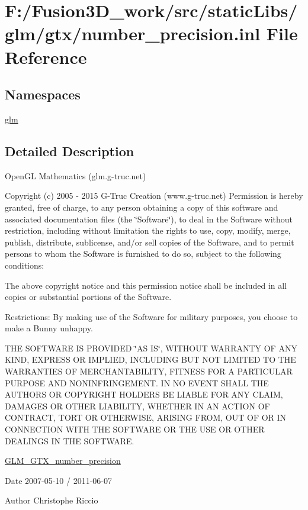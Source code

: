 \hypertarget{number__precision_8inl}{}\section{F\+:/\+Fusion3\+D\+\_\+work/src/static\+Libs/glm/gtx/number\+\_\+precision.inl File Reference}
\label{number__precision_8inl}
\subsection*{Namespaces}
\begin{DoxyCompactItemize}
\item 
 \hyperlink{namespaceglm}{glm}
\end{DoxyCompactItemize}


\subsection{Detailed Description}
Open\+G\+L Mathematics (glm.\+g-\/truc.\+net)

Copyright (c) 2005 -\/ 2015 G-\/\+Truc Creation (www.\+g-\/truc.\+net) Permission is hereby granted, free of charge, to any person obtaining a copy of this software and associated documentation files (the \char`\"{}\+Software\char`\"{}), to deal in the Software without restriction, including without limitation the rights to use, copy, modify, merge, publish, distribute, sublicense, and/or sell copies of the Software, and to permit persons to whom the Software is furnished to do so, subject to the following conditions\+:

The above copyright notice and this permission notice shall be included in all copies or substantial portions of the Software.

Restrictions\+: By making use of the Software for military purposes, you choose to make a Bunny unhappy.

T\+H\+E S\+O\+F\+T\+W\+A\+R\+E I\+S P\+R\+O\+V\+I\+D\+E\+D \char`\"{}\+A\+S I\+S\char`\"{}, W\+I\+T\+H\+O\+U\+T W\+A\+R\+R\+A\+N\+T\+Y O\+F A\+N\+Y K\+I\+N\+D, E\+X\+P\+R\+E\+S\+S O\+R I\+M\+P\+L\+I\+E\+D, I\+N\+C\+L\+U\+D\+I\+N\+G B\+U\+T N\+O\+T L\+I\+M\+I\+T\+E\+D T\+O T\+H\+E W\+A\+R\+R\+A\+N\+T\+I\+E\+S O\+F M\+E\+R\+C\+H\+A\+N\+T\+A\+B\+I\+L\+I\+T\+Y, F\+I\+T\+N\+E\+S\+S F\+O\+R A P\+A\+R\+T\+I\+C\+U\+L\+A\+R P\+U\+R\+P\+O\+S\+E A\+N\+D N\+O\+N\+I\+N\+F\+R\+I\+N\+G\+E\+M\+E\+N\+T. I\+N N\+O E\+V\+E\+N\+T S\+H\+A\+L\+L T\+H\+E A\+U\+T\+H\+O\+R\+S O\+R C\+O\+P\+Y\+R\+I\+G\+H\+T H\+O\+L\+D\+E\+R\+S B\+E L\+I\+A\+B\+L\+E F\+O\+R A\+N\+Y C\+L\+A\+I\+M, D\+A\+M\+A\+G\+E\+S O\+R O\+T\+H\+E\+R L\+I\+A\+B\+I\+L\+I\+T\+Y, W\+H\+E\+T\+H\+E\+R I\+N A\+N A\+C\+T\+I\+O\+N O\+F C\+O\+N\+T\+R\+A\+C\+T, T\+O\+R\+T O\+R O\+T\+H\+E\+R\+W\+I\+S\+E, A\+R\+I\+S\+I\+N\+G F\+R\+O\+M, O\+U\+T O\+F O\+R I\+N C\+O\+N\+N\+E\+C\+T\+I\+O\+N W\+I\+T\+H T\+H\+E S\+O\+F\+T\+W\+A\+R\+E O\+R T\+H\+E U\+S\+E O\+R O\+T\+H\+E\+R D\+E\+A\+L\+I\+N\+G\+S I\+N T\+H\+E S\+O\+F\+T\+W\+A\+R\+E.

\hyperlink{group__gtx__number__precision}{G\+L\+M\+\_\+\+G\+T\+X\+\_\+number\+\_\+precision}

\begin{DoxyDate}{Date}
2007-\/05-\/10 / 2011-\/06-\/07 
\end{DoxyDate}
\begin{DoxyAuthor}{Author}
Christophe Riccio 
\end{DoxyAuthor}
